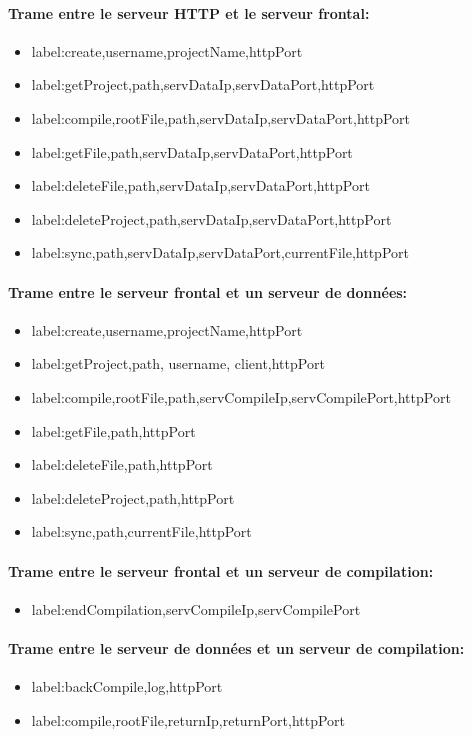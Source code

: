 \documentclass[a4paper,12pt]{article}
\begin{document}
\paragraph{Trame entre le serveur HTTP et le serveur frontal:}
\begin{itemize}
 \item label:create,username,projectName,httpPort
 \item label:getProject,path,servDataIp,servDataPort,httpPort
 \item label:compile,rootFile,path,servDataIp,servDataPort,httpPort
 \item label:getFile,path,servDataIp,servDataPort,httpPort
 \item label:deleteFile,path,servDataIp,servDataPort,httpPort
 \item label:deleteProject,path,servDataIp,servDataPort,httpPort
 \item label:sync,path,servDataIp,servDataPort,currentFile,httpPort
\end{itemize}

\paragraph{Trame entre le serveur frontal et un serveur de données:}
\begin{itemize}
 \item label:create,username,projectName,httpPort
 \item label:getProject,path, username, client,httpPort
 \item label:compile,rootFile,path,servCompileIp,servCompilePort,httpPort
 \item label:getFile,path,httpPort
 \item label:deleteFile,path,httpPort
 \item label:deleteProject,path,httpPort
 \item label:sync,path,currentFile,httpPort
\end{itemize}

\paragraph{Trame entre le serveur frontal et un serveur de compilation:}
\begin{itemize}
 \item label:endCompilation,servCompileIp,servCompilePort
\end{itemize}

\paragraph{Trame entre le serveur de données et un serveur de compilation:}
\begin{itemize}
 \item label:backCompile,log,httpPort
 \item label:compile,rootFile,returnIp,returnPort,httpPort
\end{itemize}
\end{document}
